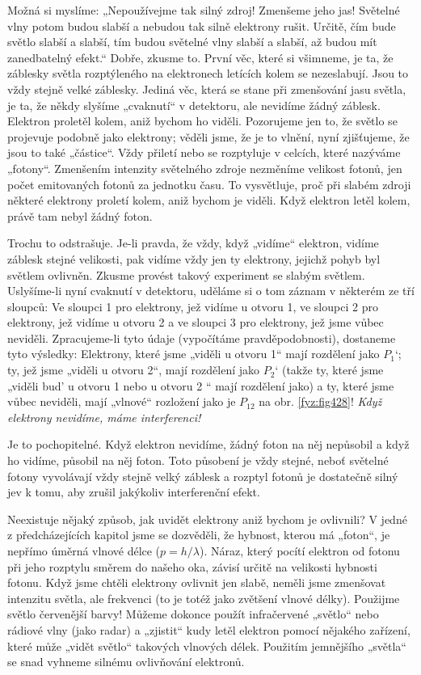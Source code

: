    Možná si myslíme: „Nepoužívejme tak silný zdroj! Zmenšeme jeho jas! Světelné vlny potom budou
    slabší a nebudou tak silně elektrony rušit. Určitě, čím bude světlo slabší a slabší, tím budou
    světelné vlny slabší a slabší, až budou mít zanedbatelný efekt.“ Dobře, zkusme to. První věc,
    které si všimneme, je ta, že záblesky světla rozptýleného na elektronech letících kolem se
    nezeslabují. Jsou to vždy stejně velké záblesky. Jediná věc, která se stane při zmenšování jasu
    světla, je ta, že někdy slyšíme „cvaknutí“ v detektoru, ale nevidíme žádný záblesk. Elektron
    proletěl kolem, aniž bychom ho viděli. Pozorujeme jen to, že světlo se projevuje podobně jako
    elektrony; věděli jsme, že je to vlnění, nyní zjišťujeme, že jsou to také „částice“. Vždy
    přiletí nebo se rozptyluje v celcích, které nazýváme „fotony“. Zmenšením intenzity světelného
    zdroje nezměníme velikost fotonů, jen počet emitovaných fotonů za jednotku času. To vysvětluje,
    proč při slabém zdroji některé elektrony proletí kolem, aniž bychom je viděli. Když elektron
    letěl kolem, právě tam nebyl žádný foton.

    Trochu to odstrašuje. Je-li pravda, že vždy, když „vidíme“ elektron, vidíme záblesk stejné
    velikosti, pak vidíme vždy jen ty elektrony, jejichž pohyb byl světlem ovlivněn. Zkusme provést
    takový experiment se slabým světlem. Uslyšíme-li nyní cvaknutí v detektoru, uděláme si o tom
    záznam v některém ze tří sloupců: Ve sloupci 1 pro elektrony, jež vidíme u otvoru 1, ve sloupci
    2 pro elektrony, jež vidíme u otvoru 2 a ve sloupci 3 pro elektrony, jež jsme vůbec neviděli.
    Zpracujeme-li tyto údaje (vypočítáme pravděpodobnosti), dostaneme tyto výsledky: Elektrony,
    které jsme „viděli u otvoru 1“ mají rozdělení jako \(P_1‘\); ty, jež jsme „viděli u otvoru 2“,
    mají rozdělení jako \(P_2‘\) (takže ty, které jsme „viděli bud' u otvoru 1 nebo u otvoru 2 “
    mají rozdělení jako) a ty, které jsme vůbec neviděli, mají „vlnové“ rozložení jako je \(P_{12}\)
    na obr. \ref{fyz:fig428}! \emph{Když elektrony nevidíme, máme interferenci!}
    
    Je to pochopitelné. Když elektron nevidíme, žádný foton na něj nepůsobil a když ho vidíme,
    působil na něj foton. Toto působení je vždy stejné, neboť světelné fotony vyvolávají vždy stejně
    velký záblesk a rozptyl fotonů je dostatečně silný jev k tomu, aby zrušil jakýkoliv
    interferenční efekt.
    
    Neexistuje nějaký způsob, jak uvidět elektrony aniž bychom je ovlivnili? V jedné z
    předcházejících kapitol jsme se dozvěděli, že hybnost, kterou má „foton“, je nepřímo úměrná
    vlnové délce (\(p= h/\lambda\)). Náraz, který pocítí elektron od fotonu při jeho rozptylu směrem
    do našeho oka, závisí určitě na velikosti hybnosti fotonu. Když jsme chtěli elektrony ovlivnit
    jen slabě, neměli jsme zmenšovat intenzitu světla, ale frekvenci (to je totéž jako zvětšení
    vlnové délky). Použijme světlo červenější barvy! Můžeme dokonce použít infračervené „světlo“
    nebo rádiové vlny (jako radar) a „zjistit“ kudy letěl elektron pomocí nějakého zařízení, které
    může „vidět světlo“ takových vlnových délek. Použitím jemnějšího „světla“ se snad vyhneme
    silnému ovlivňování elektronů.
    
